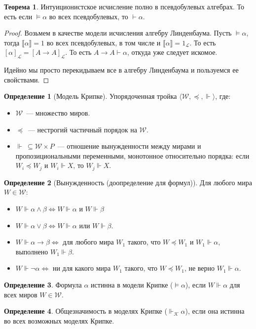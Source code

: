 \documentclass[a4paper,11pt]{article}
\theoremstyle{definition}
\newtheorem*{thm}{Теорема}
\newtheorem*{dfn}{Определение}
\newcommand{\proves}{\vdash}
\begin{document}
\begin{thm}
Интуиционистское исчисление полно в псевдобулевых алгебрах. То есть если
$\models \alpha$ во всех псевдобулевых, то $\proves \alpha$.
\end{thm}
\begin{proof}
Возьмем в качестве модели исчисления алгебру Линденбаума. Пусть $\models
\alpha$, тогда $\llbracket\alpha\rrbracket = 1$ во всех псевдобулевых, в том
числе и $\llbracket\alpha\rrbracket = 1_{\mathcal{L}}$. То есть
$[\alpha]_{\mathcal{L}} = [A \to A]_{\mathcal{L}}$. То есть $A \to A \proves
\alpha$, откуда уже следует искомое.

Идейно мы просто перекидываем все в алгебру Линденбаума и пользуемся ее
свойствами.
\end{proof}

\begin{dfn}[Модель Крипке]
Упорядоченная тройка $\langle\mathcal{W}, \preceq, \Vdash\rangle$, где:
\begin{itemize}
\item $\mathcal{W}$~--- множество миров.
\item $\preceq$~--- нестрогий частичный порядок на $\mathcal{W}$.
\item $\Vdash\ \subseteq \mathcal{W} \times P$~--- отношение вынужденности между
  мирами и пропозициональными переменными, монотонное относительно порядка:
  если $W_i \preceq W_j$ и $W_i \Vdash X$, то $W_j \Vdash X$.
\end{itemize}
\end{dfn}
\begin{dfn}[Вынужденность (доопределение для формул)]
Для любого мира $W \in \mathcal{W}$:
\begin{itemize}
\item $W \Vdash \alpha \wedge \beta \Leftrightarrow W \Vdash \alpha$ и $W
  \Vdash \beta$
\item $W \Vdash \alpha \vee \beta \Leftrightarrow W \Vdash \alpha$ или $W
  \Vdash \beta$.
\item $W \Vdash \alpha \to \beta \Leftrightarrow$ для любого мира $W_1$ такого,
  что $W \preceq W_1$ и $W_1 \Vdash \alpha$, выполнено $W_1 \Vdash \beta$.
\item $W \Vdash \neg\alpha \Leftrightarrow$ ни для какого мира $W_1$ такого,
  что $W \preceq W_1$, не верно $W_1 \Vdash \alpha$.
\end{itemize}
\end{dfn}
\begin{dfn}
Формула $\alpha$ истинна в модели Крипке ($\models \alpha$), если $W \Vdash
\alpha$ для всех миров $W \in \mathcal{W}$.
\end{dfn}
\begin{dfn}
Общезначимость в моделях Крипке ($\Vdash_{\mathcal{K}} \alpha$), если она
истинна во всех возможных моделях Крипке.
\end{dfn}
\end{document}

